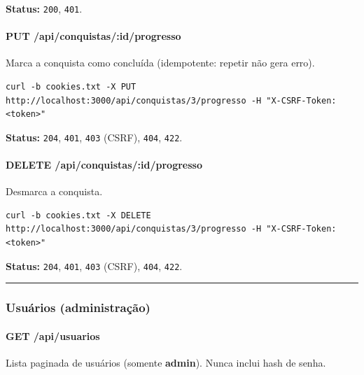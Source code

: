 \textbf{Status:} \texttt{200}, \texttt{401}.

\hypertarget{put-apiconquistasidprogresso}{%
\paragraph{PUT
/api/conquistas/:id/progresso}\label{put-apiconquistasidprogresso}}

Marca a conquista como concluída (idempotente: repetir não gera erro).

\begin{Verbatim}[breaklines,breakanywhere,fontsize=\scriptsize]
curl -b cookies.txt -X PUT http://localhost:3000/api/conquistas/3/progresso -H "X-CSRF-Token: <token>"
\end{Verbatim}

\textbf{Status:} \texttt{204}, \texttt{401}, \texttt{403} (CSRF),
\texttt{404}, \texttt{422}.

\hypertarget{delete-apiconquistasidprogresso}{%
\paragraph{DELETE
/api/conquistas/:id/progresso}\label{delete-apiconquistasidprogresso}}

Desmarca a conquista.

\begin{Verbatim}[breaklines,breakanywhere,fontsize=\scriptsize]
curl -b cookies.txt -X DELETE http://localhost:3000/api/conquistas/3/progresso -H "X-CSRF-Token: <token>"
\end{Verbatim}

\textbf{Status:} \texttt{204}, \texttt{401}, \texttt{403} (CSRF),
\texttt{404}, \texttt{422}.

\begin{center}\rule{0.5\linewidth}{0.5pt}\end{center}

\hypertarget{usuuxe1rios-administrauxe7uxe3o}{%
\subsubsection{Usuários
(administração)}\label{usuuxe1rios-administrauxe7uxe3o}}

\hypertarget{get-apiusuarios}{%
\paragraph{GET /api/usuarios}\label{get-apiusuarios}}

Lista paginada de usuários (somente \textbf{admin}). Nunca inclui hash
de senha.


